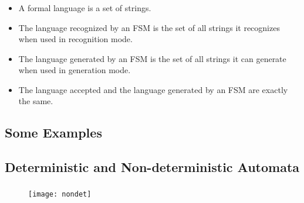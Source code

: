 \begin{frame}

	\frametitle{\insertsection}
	\framesubtitle{\insertsubsection}
	
	
	\begin{itemize}
		\item A formal language is a set of strings.
		\item The language recognized by an FSM is the set of all strings it recognizes when used in recognition mode.
		\item The language generated by an FSM is the set of all strings it can generate when used in generation mode.
		\item The language accepted and the language generated by an FSM are exactly the same.
	\end{itemize}


\end{frame}


\subsection{Some Examples}

\begin{frame}

	\frametitle{\insertsection}
	\framesubtitle{\insertsubsection}
	




\end{frame}


\subsection{Deterministic and Non-deterministic Automata}


\begin{frame}

	\frametitle{\insertsection}
	\framesubtitle{\insertsubsection}
	
	
	\begin{figure}
		\texttt{[image: nondet]}
	\end{figure}


\end{frame}


